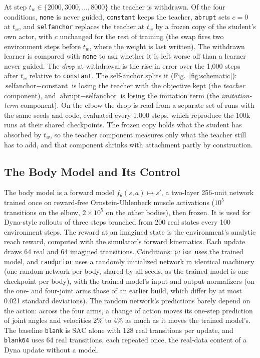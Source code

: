 \documentclass[journal]{IEEEtran}
\begin{document}
At step $t_w\in\{2000,3000,\dots,8000\}$ the teacher is withdrawn.
Of the four conditions, \texttt{none} is never guided, \texttt{constant} keeps the teacher,
\texttt{abrupt} sets $c=0$ at $t_w$, and \texttt{selfanchor} replaces the
teacher at $t_w$ by a frozen copy of the student's own actor, with $c$
unchanged for the rest of training (the swap fires two environment steps
before $t_w$, where the weight is last written). The withdrawn learner is
compared with \texttt{none} to ask whether it is left worse off than a learner
never guided. The \emph{drop} at withdrawal is the rise in error over the
1{,}000 steps after $t_w$ relative to \texttt{constant}. The self-anchor splits
it (Fig.~\ref{fig:schematic}): $\text{selfanchor}-\text{constant}$ is losing the teacher with the
objective kept (the \emph{teacher} component), and $\text{abrupt}-\text{selfanchor}$
is losing the imitation term (the \emph{imitation-term} component). On the elbow the
drop is read from a separate set of runs with the same seeds and code,
evaluated every 1{,}000 steps, which reproduce the 100k runs at their shared
checkpoints. The frozen copy
holds what the student has absorbed by $t_w$, so the teacher component measures
only what the teacher still has to add, and that component shrinks with attachment partly
by construction.

\subsection{The Body Model and Its Control}
The body model is a forward model $f_\theta(s,a)\mapsto s'$, a two-layer
256-unit network trained once on reward-free Ornstein-Uhlenbeck muscle
activations ($10^5$ transitions on the elbow, $2\times10^5$ on the other
bodies), then frozen. It is used for Dyna-style \cite{sutton1991} rollouts of three
steps branched from 200 real states every 100 environment steps. The reward at
an imagined state is the environment's analytic reach reward, computed with the
simulator's forward kinematics. Each update draws 64 real and 64 imagined
transitions. Conditions: \texttt{prior} uses the trained model, and
\texttt{randprior} uses a randomly initialized network in identical machinery
(one random network per body, shared by all seeds, as the trained model is one
checkpoint per body), with the trained model's input and output normalizers (on the one- and
four-joint arms those of an earlier build, which differ by at most 0.021
standard deviations). The random network's predictions barely depend on the action: across the
four arms, a change of action moves its one-step prediction of joint angles and velocities 2\% to 4\% as much as
it moves the trained model's. The baseline \texttt{blank} is SAC alone with 128 real
transitions per update, and \texttt{blank64} uses 64 real transitions, each
repeated once, the real-data content of a Dyna update without a model.
\end{document}
